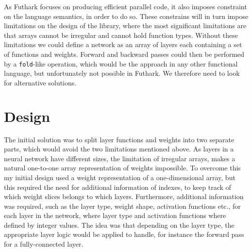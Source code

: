 \label{chap:design}
As Futhark focuses on producing efficient parallel code, it also imposes
constraint on the language semantics, in order to do so. 
These constrains will in turn impose limitations on the design of the library,
where the most significant limitations are that arrays cannot be irregular and
cannot hold function types. 
Without these limitations we could define a network as an array of layers each
containing a set of functions and weights. 
Forward and backward passes could then be performed by a \texttt{fold}-like
operation, which would be the approach in any other functional language, 
but unfortunately not possible in Futhark. We therefore need to look for
alternative solutions.
\section{Design}

The initial solution was to split layer functions and weights into two separate
parts, which would avoid the two limitations mentioned above. 
As layers in a neural network have different sizes, the limitation of irregular
arrays, makes a natural one-to-one array representation of weights impossible. 
To overcome this my initial design used a weight representation of a
one-dimensional array, but this required the need for additional information of
indexes, to keep track of which weight slices belongs to which layers. 
Furthermore, additional information was required, such as the layer type, weight
shape, activation functions etc., for each layer in the network, where layer
type and activation functions where defined by integer values. 
The idea was that depending on the layer type, the appropriate layer logic would
be applied to handle, for instance the forward pass for a fully-connected layer.

